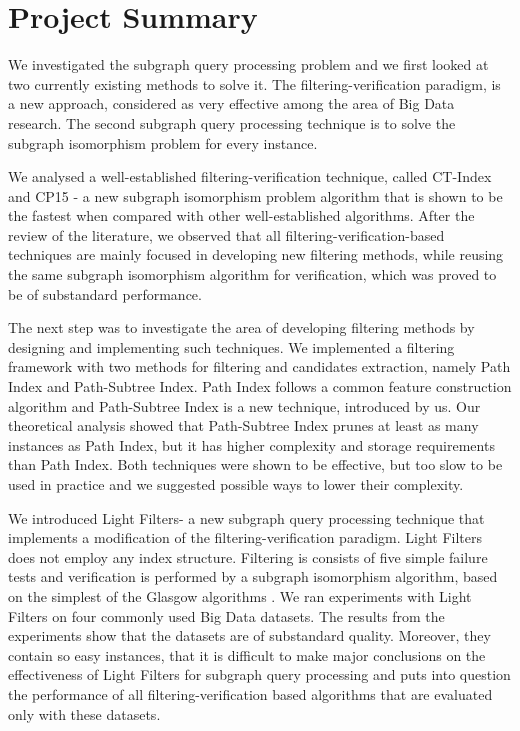 \documentclass{l4proj}
\begin{document}
\section{Project Summary}
We investigated the subgraph query processing problem and we first looked at two currently existing methods to solve it. The filtering-verification paradigm, is a new approach, considered as very effective among the area of Big Data research. The second subgraph query processing technique is to solve the subgraph isomorphism problem for every instance.

We analysed a well-established filtering-verification technique, called CT-Index \cite{ctindex} and CP15 \cite{CP2015}- a new subgraph isomorphism problem algorithm that is shown to be the fastest when compared with other well-established algorithms. After the review of the literature, we observed that all filtering-verification-based techniques are mainly focused in developing new filtering methods, while reusing the same subgraph isomorphism algorithm for verification, which was proved to be of substandard performance.

The next step was to investigate the area of developing filtering methods by designing and implementing such techniques. We implemented a filtering framework with two methods for filtering and candidates extraction, namely Path Index and Path-Subtree Index. Path Index follows a common feature construction algorithm and Path-Subtree Index is a new technique, introduced by us. Our theoretical analysis showed that Path-Subtree Index prunes at least as many instances as Path Index, but it has higher complexity and storage requirements than Path Index. Both techniques were shown to be effective, but too slow to be used in practice and we suggested possible ways to lower their complexity.

We introduced Light Filters- a new subgraph query processing technique that implements a modification of the filtering-verification paradigm. Light Filters does not employ any index structure. Filtering is consists of five simple failure tests and verification is performed by a subgraph isomorphism algorithm, based on the simplest of the Glasgow algorithms \cite{CP2015}. We ran experiments with Light Filters on four commonly used Big Data datasets. The results from the experiments show that the datasets are of substandard quality. Moreover, they contain so easy instances, that it is difficult to make major conclusions on the effectiveness of Light Filters for subgraph query processing and puts into question the performance of all filtering-verification based algorithms that are evaluated only with these datasets.
\end{document}
